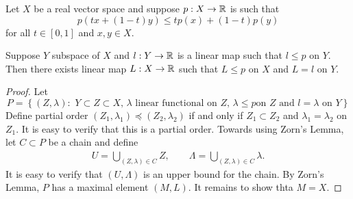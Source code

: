 \documentclass[a4paper]{article}
\begin{document}
\begin{thm}
  Let $X$ be a real vector space and suppose $p: X \to \mathbb{R}$
  is such that
  \[
    p(tx + (1-t)y) \leq t p(x) + (1 - t) p (y)
  \]
  for all $t \in [0,1]$ and $x, y \in X$.

  Suppose $Y$ subspace of $X$ and $l: Y \to \mathbb{R}$ is a linear map such that
  $l \leq p$ on $Y$. Then there exists linear map $L: X \to \mathbb{R}$ such that
  $L \leq p$ on $X$ and $L = l$ on $Y$.
\end{thm}

\begin{proof}

  Let
  \[
    P = \left\{ (Z, \lambda): \text{
  $Y \subset Z \subset X$,
  $\lambda$ linear functional on $Z$, $\lambda \leq p$
    on $Z$ and $l = \lambda$ on $Y$} \right\}
  \]
  Define partial order $(Z_1, \lambda_1) \preceq (Z_2, \lambda_2)$ if and
  only if $Z_1 \subset Z_2$ and $\lambda_1 = \lambda_2$ on $Z_1$. It is
  easy to verify that this is a partial order. Towards using Zorn's Lemma,
  let $C \subset P$ be a chain and define
  \[
    \begin{aligned}
      U = \bigcup_{(Z, \lambda) \in C} Z, \qquad
      \Lambda = \bigcup_{(Z, \lambda) \in C} \lambda.
    \end{aligned}
  \]
  It is easy to verify that $(U, \Lambda)$ is an upper bound for the
  chain. By Zorn's Lemma, $P$ has a maximal element $(M, L)$. It remains
  to show thta $M = X$.


\end{proof}
\end{document}
